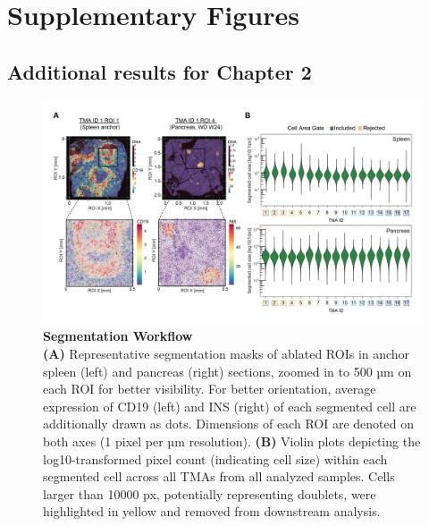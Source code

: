 
\chapter{Supplementary Figures}
\clearpage

\section{Additional results for Chapter 2}

\begin{figure}[htbp]
    \centering
    \includegraphics[width=\linewidth]{Appendix2/Fig/F2-A4-01.png}
    \caption[imc-segmentation]{\textbf{Segmentation Workflow}\\
    \textbf{(A)} Representative segmentation masks of ablated ROIs in anchor spleen (left) and pancreas (right) sections, zoomed in to 500 µm on each ROI for better visibility. For better orientation, average expression of CD19 (left) and INS (right) of each segmented cell are additionally drawn as dots. Dimensions of each ROI are denoted on both axes (1 pixel per µm resolution). \textbf{(B)} Violin plots depicting the log10-transformed pixel count (indicating cell size) within each segmented cell across all TMAs from all analyzed samples. Cells larger than 10000 px, potentially representing doublets, were highlighted in yellow and removed from downstream analysis.}
    \label{suppl_fig:imc_segmentation}
\end{figure}




